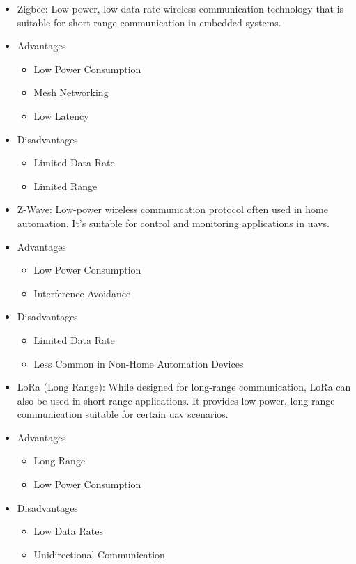 \begin{itemize}
\item Zigbee: Low-power, low-data-rate wireless communication technology that is suitable for short-range communication in embedded systems.
    \item Advantages 
        \begin{itemize}
            \item Low Power Consumption
            \item Mesh Networking
            \item Low Latency
        \end{itemize}
    \item Disadvantages
        \begin{itemize}
            \item Limited Data Rate
            \item Limited Range
        \end{itemize}
        
\item Z-Wave: Low-power wireless communication protocol often used in home automation. It's suitable for control and monitoring applications in \glspl{uav}.
    \item Advantages 
        \begin{itemize}
            \item Low Power Consumption
            \item Interference Avoidance
        \end{itemize}
    \item Disadvantages 
        \begin{itemize}
            \item Limited Data Rate
            \item Less Common in Non-Home Automation Devices
        \end{itemize}
        
\item LoRa (Long Range): While designed for long-range communication, LoRa can also be used in short-range applications. It provides low-power, long-range communication suitable for certain \gls{uav} scenarios.
    \item Advantages 
        \begin{itemize}
            \item Long Range
            \item Low Power Consumption
        \end{itemize}
    \item Disadvantages
        \begin{itemize}
            \item Low Data Rates
            \item Unidirectional Communication
        \end{itemize}
\end{itemize}